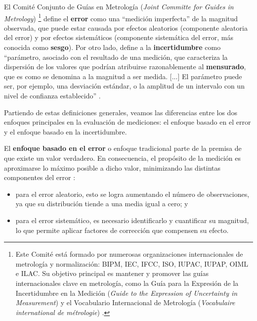 El Comité Conjunto de Guías en Metrología (\textit{Joint Committe for Guides in Metrology})%
\footnote{
    Este Comité está formado por numerosas organizaciones internacionales de metrología y normalización: 
    BIPM, IEC, IFCC, ISO, IUPAC, IUPAP, OIML e ILAC. Su objetivo principal es mantener y promover las 
    guías internacionales clave en metrología, como la Guía para la Expresión de la Incertidumbre en la 
    Medición (\textit{Guide to the Expression of Uncertainty in Measurement}) \cite{jcgm100:2008} y el 
    Vocabulario Internacional de Metrología (\textit{Vocabulaire international de métrologie}) 
    \cite{jcgm200:2012}.
}
define el \textbf{error} como una ``medición imperfecta'' de la magnitud observada, que puede estar causada
por efectos aleatorios (componente aleatoria del error) y por efectos sistemáticos (componente sistemática del 
error, más conocida como \textbf{sesgo}).
Por otro lado, define a la \textbf{incertidumbre} como ``parámetro, asociado con el resultado de una medición, 
que caracteriza la dispersión de los valores que podrían atribuirse razonablemente al \textbf{mensurado}, que
es como se denomina a la magnitud a ser medida. [...] El parámetro puede ser, por ejemplo, una desviación 
estándar, o la amplitud de un intervalo con un nivel de confianza establecido'' \cite{jcgm100:2008}.

Partiendo de estas definiciones generales, veamos las diferencias entre los dos enfoques principales en la 
evaluación de mediciones: el enfoque basado en el error y el enfoque basado en la incertidumbre.

El \textbf{enfoque basado en el error} o enfoque tradicional parte de la premisa de que existe un valor 
verdadero. En consecuencia, el propósito de la medición es aproximarse lo máximo posible a dicho valor, 
minimizando las distintas componentes del error \cite{jcgm100:2008}:

\begin{itemize}

    \item para el error aleatorio, esto se logra aumentando el número de observaciones, ya que su distribución 
    tiende a una media igual a cero; y

    \item para el error sistemático, es necesario identificarlo y cuantificar su magnitud, lo que permite 
    aplicar factores de corrección que compensen su efecto.

\end{itemize}

